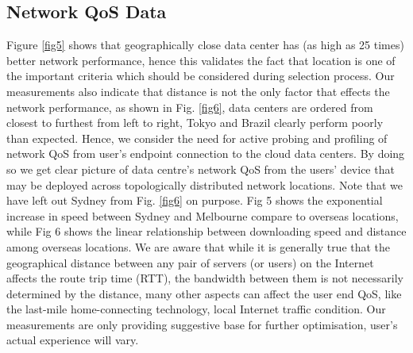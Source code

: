 \documentclass[journal]{IEEEtran}
\begin{document}
\subsection{Network QoS Data}
Figure \ref{fig5} shows that geographically close data center has (as high as 25 times) better network performance, hence this validates the fact that location is one of the important criteria which should be considered during selection process. Our measurements also indicate that distance is not the only factor that effects the network performance, as shown in Fig. \ref{fig6}, data centers are ordered from closest to furthest from left to right, Tokyo and Brazil clearly perform poorly than expected. Hence, we consider the need for active probing and profiling of network QoS from user's endpoint connection to the cloud data centers. By doing so we get clear picture of data centre's network QoS from the users' device that may be deployed across topologically distributed network locations. Note that we have left out Sydney from Fig. \ref{fig6} on purpose. Fig 5 shows the exponential increase in speed between Sydney and Melbourne compare to overseas locations, while Fig 6 shows the linear relationship between downloading speed and distance among overseas locations. We are aware that while it is generally true that the geographical distance between any pair of servers (or users) on the Internet affects the route trip time (RTT), the bandwidth between them is not necessarily determined by the distance, many other aspects can affect the user end QoS, like the last-mile home-connecting technology, local Internet traffic condition. Our measurements are only providing suggestive base for further optimisation, user's actual experience will vary.
\end{document}

